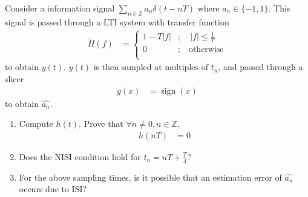 \documentclass[titlepage, fleqn, a4paper, 12pt, twoside]{article}
\theoremstyle{definition}
\theoremstyle{theorem}
\renewcommand{\tilde}{\widetilde}
\DeclareMathOperator{\sign}{\mathrm{sign}}
\begin{document}
\begin{question}
	Consider a information signal $\sum\limits_{n \in \mathbb{Z}} a_n \delta(t - n T)$ where $a_n \in \{-1,1\}$.
	This signal is passed through a LTI system with transfer function
	\begin{align*}
		\tilde{H}(f) &=
			\begin{cases}
				1 - T |f| &;\quad |f| \le \frac{1}{T}\\
				0 &;\quad \text{otherwise}\\
			\end{cases}
	\end{align*}
	to obtain $y(t)$.
	$y(t)$ is then sampled at multiples of $t_n$, and passed through a slicer
	\begin{align*}
		g(x) &= \sign(x)
	\end{align*}
	to obtain $\hat{a_n}$.
	\begin{enumerate}
		\item
			Compute $h(t)$.
			Prove that $\forall n \neq 0, n \in \mathbb{Z}$,
			\begin{align*}
				h(n T) &= 0
			\end{align*}
		\item
			Does the NISI condition hold for $t_n = n T + \frac{T}{4}$?
		\item
			For the above sampling times, is it possible that an estimation error of $\hat{a_n}$ occurs due to ISI?
	\end{enumerate}
\end{question}
\end{document}
